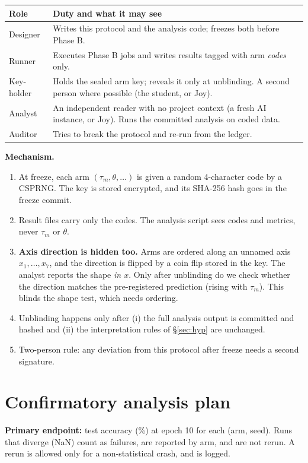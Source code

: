 \documentclass[10pt,a4paper]{article}
\newcommand{\taum}{\tau_m}
\begin{document}
\begin{center}\small
\begin{tabularx}{\textwidth}{@{}L{2.5cm}X@{}}
\toprule Role & Duty and what it may see\\ \midrule
Designer & Writes this protocol and the analysis code; freezes both before Phase B.\\
Runner & Executes Phase B jobs and writes results tagged with arm \emph{codes} only.\\
Key-holder & Holds the sealed arm key; reveals it only at unblinding. A second person where possible (the student, or Joy).\\
Analyst & An independent reader with no project context (a fresh AI instance, or Joy). Runs the committed analysis on coded data.\\
Auditor & Tries to break the protocol and re-run from the ledger.\\
\bottomrule\end{tabularx}
\end{center}

\textbf{Mechanism.}
\begin{enumerate}
\item At freeze, each arm $(\taum,\theta,\dots)$ is given a random 4-character code by a CSPRNG. The key is stored encrypted, and its SHA-256 hash goes in the freeze commit.
\item Result files carry only the codes. The analysis script sees codes and metrics, never $\taum$ or $\theta$.
\item \textbf{Axis direction is hidden too.} Arms are ordered along an unnamed axis $x_1,\dots,x_7$, and the direction is flipped by a coin flip stored in the key. The analyst reports the shape \emph{in $x$}. Only after unblinding do we check whether the direction matches the pre-registered prediction (rising with $\taum$). This blinds the shape test, which needs ordering.
\item Unblinding happens only after (i) the full analysis output is committed and hashed and (ii) the interpretation rules of \S\ref{sec:hyp} are unchanged.
\item Two-person rule: any deviation from this protocol after freeze needs a second signature.
\end{enumerate}

\section{Confirmatory analysis plan}\label{sec:analysis}
\textbf{Primary endpoint:} test accuracy (\%) at epoch 10 for each (arm, seed). Runs that diverge (NaN) count as failures, are reported by arm, and are not rerun. A rerun is allowed only for a non-statistical crash, and is logged.
\end{document}

